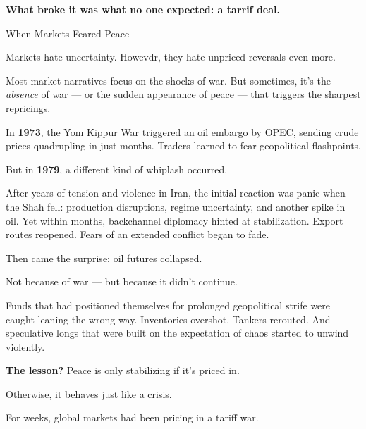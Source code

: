 \textbf{What broke it was what no one expected: a tarrif deal.}

\begin{HistoricalSidebar}{When Markets Feared Peace}

  Markets hate uncertainty. Howevdr, they hate unpriced reversals even more.

  \medskip
  
  Most market narratives focus on the shocks of war. But sometimes, it’s the \textit{absence} of war — or the sudden 
  appearance of peace — that triggers the sharpest repricings.

  \medskip
  
  In \textbf{1973}, the Yom Kippur War triggered an oil embargo by OPEC, sending crude prices quadrupling in just months. 
  Traders learned to fear geopolitical flashpoints.

  \medskip
  
  But in \textbf{1979}, a different kind of whiplash occurred.

  \medskip
  
  After years of tension and violence in Iran, the initial reaction was panic when the Shah fell: 
  production disruptions, 
  regime uncertainty, and another spike in oil. Yet within months, backchannel diplomacy hinted 
  at stabilization. Export 
  routes reopened. Fears of an extended conflict began to fade.

  \medskip
  
  Then came the surprise: oil futures collapsed.

  \medskip
  
  Not because of war — but because it didn’t continue.

  \medskip
  
  Funds that had positioned themselves for prolonged geopolitical strife were caught leaning the wrong way. Inventories 
  overshot. Tankers rerouted. And speculative longs that were built on the expectation of chaos started to unwind 
  violently.
  
  \medskip
  
  \textbf{The lesson?} Peace is only stabilizing if it’s priced in.

  \medskip
  
  Otherwise, it behaves just like a crisis.
  
\end{HistoricalSidebar}

For weeks, global markets had been pricing in a tariff war. 

